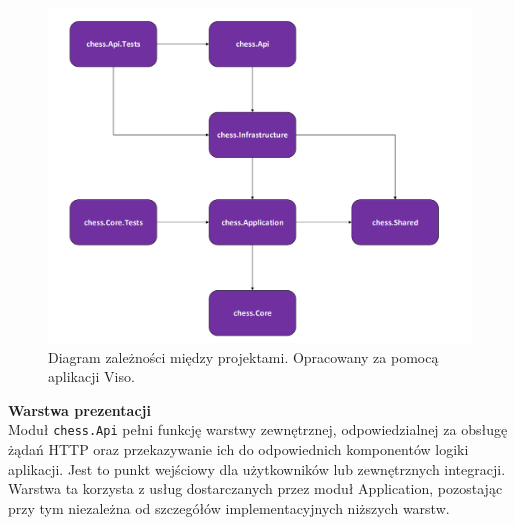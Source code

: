 \documentclass[12pt,a4paper]{article}
\begin{document}
\vspace{0.5cm}
\begin{figure}[h!]
    \centering
    \includegraphics[width=1\textwidth]{images/diagram_dependencies.png}
    \caption{Diagram zależności między projektami. Opracowany za pomocą aplikacji Viso.}
\end{figure}

\newpage

\noindent \textbf{Warstwa prezentacji}\\
Moduł \texttt{chess.Api} pełni funkcję warstwy zewnętrznej, odpowiedzialnej za obsługę żądań HTTP oraz przekazywanie ich do odpowiednich komponentów logiki aplikacji. Jest to punkt wejściowy dla użytkowników lub zewnętrznych integracji. Warstwa ta korzysta z usług dostarczanych przez moduł Application, pozostając przy tym niezależna od szczegółów implementacyjnych niższych warstw.
\end{document}
